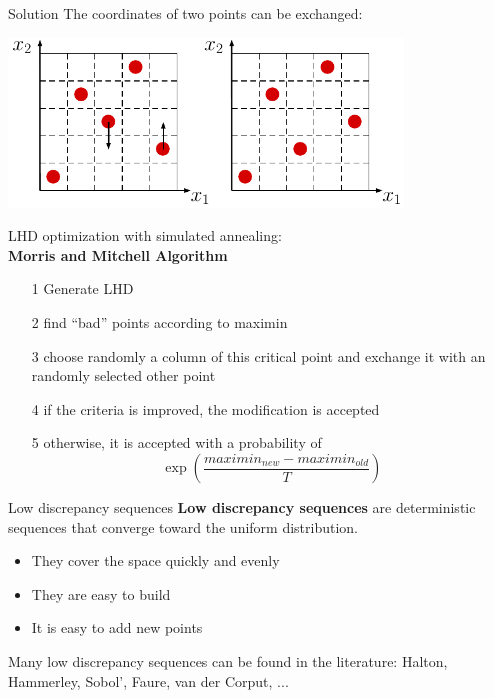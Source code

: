 \documentclass{beamer}
\begin{document}
\begin{frame}{}
\begin{exampleblock}{Solution}
The coordinates of two points can be exchanged:\\
\vspace{4mm}
\begin{center}
\includegraphics[height=4.5cm]{figures/latexdraw/lhs3}
\end{center}
\end{exampleblock}
\end{frame}

\begin{frame}{}
LHD optimization with simulated annealing:\\
\vspace{4mm}
\textbf{Morris and Mitchell Algorithm}\\
\vspace{2mm}
\begin{itemize}
	\item[1] Generate LHD
	\item[2] find ``bad'' points according to maximin
	\item[3] choose randomly a column of this critical point and exchange it with an randomly selected other point
	\item[4] \qquad if the criteria is improved, the modification is accepted
	\item[5] \qquad otherwise, it is accepted with a probability of $$\exp \left(\frac{maximin_{new}-maximin_{old}}{T}\right)$$
	\end{itemize}
\end{frame}



\begin{frame}{Low discrepancy sequences}
\textbf{Low discrepancy sequences} are deterministic sequences that converge toward the uniform distribution. 
\begin{itemize}
	\item They cover the space quickly and evenly
	\item They are easy to build
	\item It is easy to add new points
\end{itemize}
\vspace{5mm}
Many low discrepancy sequences can be found in the literature: Halton, Hammerley, Sobol', Faure, van der Corput, ...
\end{frame}
\end{document}
